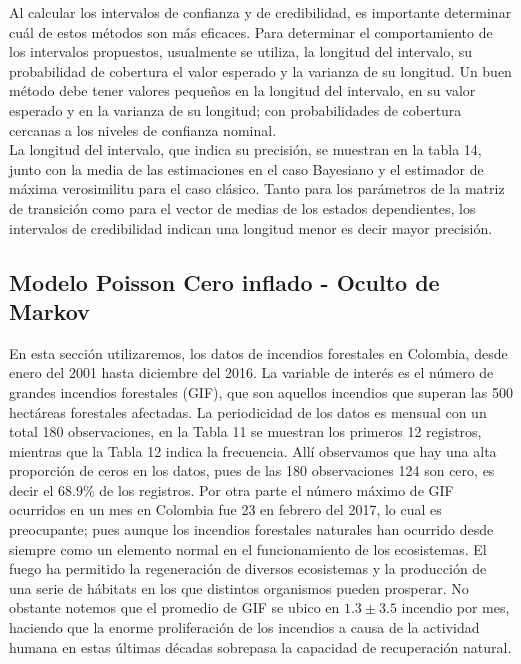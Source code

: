 \documentclass[a4paper]{article}\usepackage[]{graphicx}\usepackage[]{color}
\begin{document}
Al calcular los intervalos de confianza y de credibilidad, es importante determinar cuál de estos métodos son más eficaces. Para determinar el comportamiento de los intervalos propuestos, usualmente se utiliza, la longitud del intervalo, su probabilidad de cobertura el valor esperado y la varianza de su longitud. Un buen método debe tener valores pequeños en la longitud del intervalo, en su valor esperado y en la varianza de su longitud; con probabilidades de cobertura cercanas a los niveles de confianza nominal.
\\
La longitud del intervalo, que indica su precisión, se muestran en la tabla 14, junto con la media de las estimaciones en el caso Bayesiano y el estimador de máxima verosimilitu para el caso clásico. Tanto para los parámetros de la matriz de transición como para el vector de medias de los estados dependientes, los intervalos de credibilidad indican una longitud menor es decir mayor precisión.

\clearpage

\subsection{Modelo Poisson Cero inflado - Oculto de Markov}



En esta sección utilizaremos, los datos de incendios forestales en Colombia, desde enero del 2001 hasta diciembre del 2016. La variable de interés es el número de grandes incendios forestales (GIF), que son aquellos incendios que superan las 500 hectáreas forestales afectadas. La periodicidad de los datos es mensual con un total 180 observaciones, en la Tabla 11 se muestran los primeros 12 registros, mientras que la Tabla 12 indica la frecuencia. Allí observamos que hay una alta proporción de ceros en los datos, pues de las 180 observaciones 124 son cero, es decir el $68.9 \%$ de los registros. Por otra parte el número máximo de GIF ocurridos en un mes en Colombia fue 23 en febrero del 2017, lo cual es preocupante; pues aunque los incendios forestales naturales han ocurrido desde siempre como un elemento normal en el funcionamiento de los ecosistemas. El fuego ha permitido la regeneración de diversos ecosistemas y la producción de una serie de hábitats en los que distintos organismos pueden prosperar. No obstante notemos que el promedio de GIF se ubico en $1.3 \pm 3.5$ incendio por mes, haciendo que la enorme proliferación de los incendios a causa de la actividad humana en estas últimas décadas sobrepasa la capacidad de recuperación natural.
\end{document}

